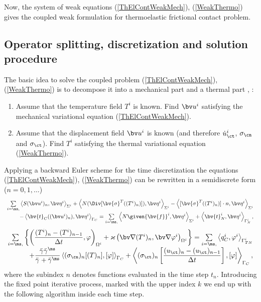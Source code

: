 Now, the system of weak equations (\ref{ThElContWeakMech}), (\ref{WeakThermo}) gives the coupled weak formulation for thermoelastic frictional contact problem.

\subsection{Operator splitting, discretization and solution procedure} \label{sec:decomp}

The basic idea to solve the coupled problem (\ref{ThElContWeakMech}), (\ref{WeakThermo}) is to decompose it into a mechanical part and a thermal part \cite{JoKl93}, \cite{WrMi94}:
\begin{enumerate}
\item Assume that the temperature field $T^i$ is known. Find $\bv u^i$ satisfying the mechanical variational equation (\ref{ThElContWeakMech}).
\item Assume that the displacement field $\bv u^i$ is known (and therefore $\dot u_\ct^i$, $\sigma_\cn$ and $\sigma_\ct$). Find $T^i$ satisfying the thermal variational equation (\ref{WeakThermo}).
\end{enumerate}

Applying a backward Euler scheme for the time discretization the equations (\ref{ThElContWeakMech}), (\ref{WeakThermo}) can be rewritten in a semidiscrete form ($n=0,1,\ldots$)
\begin{equation} \label{DWeakMech}
\begin{array}{r}
\sum \limits_{i=\ms,\sl}  
\left\langle S (\bv u^i)_n, \bv \eta^i \right\rangle_{\Sigma^i} 
+ \left\langle  N (\Div[\bv{\sigma}^T((T^i)_n)]), \bv \eta^i \right\rangle_{\Sigma^i}
- \left\langle [\bv{\sigma}^T((T^i)_n)] \cdot n, \bv \eta^i\right\rangle_{\Sigma^i} \\[2ex]
- \left\langle \bv{t}_C((\bv u^i)_n), \bv \eta^i \right\rangle_{\Gamma_C} 
= \sum \limits_{i=\ms,\sl} 
\left\langle N \given{\bv{f}}^i, \bv \eta^i \right\rangle_{\Sigma^i}
+ \left\langle \bv{t}^i_N, \bv \eta^i \right\rangle_{\Gamma_N^i},
\end{array}
\end{equation}
\begin{equation} \label{DWeakThermo}
\begin{array}{r}
\sum \limits_{i=\ms,\sl} \left\lbrace 
\left(\dfrac{(T^i)_n - (T^i)_{n-1}}{\Delta t},\varphi \right)_{\Omega^i} 
+ \varkappa \left(\bv \nabla (T^i)_n, \bv \nabla \varphi^i \right)_{\Omega^i} \right\rbrace 
= \sum \limits_{i=\ms,\sl} 
\left\langle q_{C}^i,\varphi^i \right\rangle_{\Gamma^i_{TN}} \\
+ \dfrac{\bar{\gamma}^{\sl} \bar{\gamma}^{\ms}}{\bar{\gamma}^{\sl} + \bar{\gamma}^{\ms}} \left\langle (\sigma_\cn)_n [(T)_n], [\varphi] \right\rangle_{\Gamma_C}
+ \left\langle (\sigma_\ct)_n \left[\dfrac{(u_\ct)_n - (u_\ct)_{n-1}}{\Delta t}\right], [\varphi] \right\rangle_{\Gamma_C},
\end{array}
\end{equation}
where the subindex $n$ denotes functions evaluated in the time step $t_n$.
Introducing the fixed point iterative process, marked with the upper index $k$ we end up with the following algorithm inside each time step.

